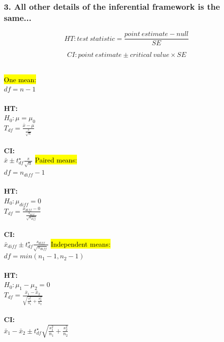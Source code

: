 \documentclass[slidestop,compress,mathserif,12pt,t,professionalfonts,xcolor=table]{beamer}
\begin{document}
\begin{frame}
\frametitle{3. All other details of the inferential framework is the same...}

\[ HT: test~statistic = \frac{point~estimate - null}{SE} \]

\pause

\[ CI: point~estimate \pm critical~value \times SE \]

\pause

$\:$ \\

{
\hl{One mean:} \\
{\small $df = n - 1$} \\
$\:$ \\
\textbf{HT:} \\
$H_0: \mu = \mu_0$ \\
$T_{df} = \frac{\bar{x} - \mu}{\frac{s}{\sqrt{n}}}$ \\
$\:$ \\
\textbf{CI:} \\
$\bar{x} \pm t^\star_{df} \frac{s}{\sqrt{n}}$
}
{\pause
\hl{Paired means:} \\
{\small $df = n_{diff} - 1$}
$\:$ \\$\:$ \\
\textbf{HT:} \\
$H_0: \mu_{diff} = 0$ \\
$T_{df} = \frac{\bar{x}_{diff} -0}{\frac{s_{diff}}{\sqrt{n_{diff}}}}$ \\
$\:$ \\
\textbf{CI:} \\
$\bar{x}_{diff} \pm t^\star_{df} \frac{s_{diff}}{\sqrt{n_{diff}}}$
}
{\pause
\hl{Independent means:} \\
{\small $df = min(n_1 - 1, n_2 - 1)$}
$\:$ \\$\:$ \\
\textbf{HT:} \\
$H_0: \mu_1 - \mu_2 = 0$ \\
$T_{df} = \frac{\bar{x}_1 - \bar{x}_2}{\sqrt{ \frac{s_1^2}{n_1} + \frac{s_2^2}{n_2} }}$ \\
$\:$ \\
\textbf{CI:} \\
$\bar{x}_1 - \bar{x}_2 \pm t^\star_{df} \sqrt{ \frac{s_1^2}{n_1} + \frac{s_2^2}{n_2} }$
}

\end{frame}

\end{document}
